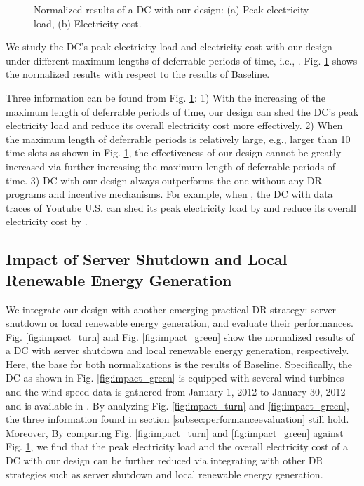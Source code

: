 \documentclass[conference]{IEEEtran}
\begin{document}
\begin{figure}[!t]
\centering
{}
\centering\caption{Normalized results of a DC with our design: (a) Peak electricity load, (b) Electricity cost.}\label{fig:performance}
\end{figure}

We study the DC's peak electricity load and electricity cost with our design under different maximum lengths of deferrable periods of time, i.e., . Fig. \ref{fig:performance} shows the normalized results with respect to the results of Baseline.

Three information can be found from Fig. \ref{fig:performance}: 1) With the increasing of the maximum length of deferrable periods of time, our design can shed the DC's peak electricity load and reduce its overall electricity cost more effectively. 2) When the maximum length of deferrable periods is relatively large, e.g., larger than 10 time slots as shown in Fig. \ref{fig:performance}, the effectiveness of our design cannot be greatly increased via further increasing the maximum length of deferrable periods of time. 3) DC with our design always outperforms the one without any DR  programs and incentive mechanisms. For example, when , the DC with data traces of Youtube U.S. can shed its peak electricity load by  and reduce its overall electricity cost by .

\subsection{Impact of Server Shutdown and Local Renewable Energy Generation}\label{subsec:impact}
We integrate our design with another emerging practical DR strategy: server shutdown or local renewable energy generation, and evaluate their performances. Fig. \ref{fig:impact_turn} and Fig.
\ref{fig:impact_green} show the normalized results of a DC with server shutdown and local renewable energy generation, respectively. Here, the base for both normalizations is the results of Baseline. Specifically, the DC as shown in Fig.
\ref{fig:impact_green} is equipped with several wind turbines and the wind speed data is gathered from January 1, 2012 to January 30, 2012 and is available in \cite{winddata}. By analyzing Fig. \ref{fig:impact_turn} and
\ref{fig:impact_green}, the three information found in section \ref{subsec:performanceevaluation} still hold.  Moreover, By comparing Fig. \ref{fig:impact_turn} and 
\ref{fig:impact_green} against Fig. \ref{fig:performance}, we find that the peak electricity load and the overall electricity cost of a DC with our design can be further reduced via integrating with other DR strategies such as server shutdown and local renewable energy generation.
\end{document}
